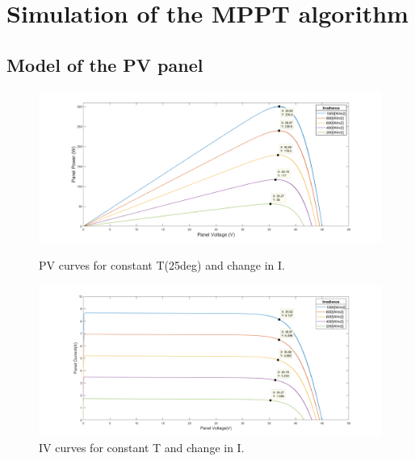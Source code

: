 
\section{Simulation of the MPPT algorithm} \label{MPPTSimulation}
\subsection{Model of the PV panel}

\begin{figure}[H]
	\begin{minipage}[b]{0.8\linewidth}
		\centering
		\includegraphics[width=\textwidth]{../Pictures/PV_curves_T25degrees}
		\caption{PV curves for constant T(25deg) and change in I.}
		\label{fig:PVcurves_T25}
	\end{minipage}
	\hspace{0.5cm}
	\begin{minipage}[b]{0.8\linewidth}
		\centering
		\includegraphics[width=\textwidth]{../Pictures/IV_curves_T25degrees}
		\caption{IV curves for constant T and change in I.}
		\label{fig:IVcurves_T25}
	\end{minipage}
\end{figure}

